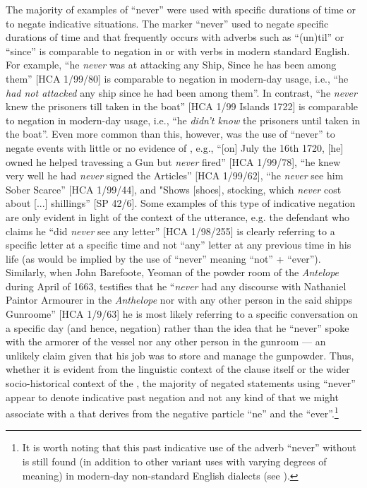 The majority of examples of “never” were used with specific durations of time or to negate indicative  situations. The marker “never” used to negate specific durations of time and that frequently occurs with adverbs such as “(un)til” or “since” is comparable to negation in  or with  verbs in modern standard English. For example, “he \textit{never} was at attacking any Ship, Since he has been among them” [HCA 1/99/80] is comparable to  negation in modern-day usage, i.e., “he \textit{had not attacked} any ship since he had been among them”. In contrast, “he \textit{never} knew the prisoners till taken in the boat” [HCA 1/99  Islands 1722] is comparable to  negation in modern-day usage, i.e., “he \textit{didn't know} the prisoners until taken in the boat”. Even more common than this, however, was the use of “never” to negate events with little or no evidence of , e.g., “[on] July the 16th 1720, [he] owned he helped travessing a Gun but \textit{never} fired” [HCA 1/99/78], “he knew very well he had \textit{never} signed the Articles” [HCA 1/99/62], “he \textit{never} see him Sober Scarce” [HCA 1/99/44], and "Shows [shoes], stocking, which \textit{never} cost about [...] shillings” [SP 42/6]. Some examples of this type of indicative  negation are only evident in light of the context of the utterance, e.g. the defendant who claims he “did \textit{never} see any letter” [HCA 1/98/255] is clearly referring to a specific letter at a specific time and not “any” letter at any previous time in his life (as would be implied by the use of “never” meaning “not” + “ever”). Similarly, when John Barefoote, Yeoman of the powder room of the \textit{Antelope} during April of 1663, testifies that he “\textit{never} had any discourse with Nathaniel Paintor Armourer in the \textit{Anthelope} nor with any other person in the said shipps Gunroome” [HCA 1/9/63] he is most likely referring to a specific conversation on a specific day (and hence,  negation) rather than the idea that he “never” spoke with the armorer of the vessel nor any other person in the gunroom — an unlikely claim given that his job was to store and manage the gunpowder. Thus, whether it is evident from the linguistic context of the clause itself or the wider socio-historical context of the , the majority of negated statements using “never” appear to denote indicative past negation and not any kind of  that we might associate with a  that derives from the negative particle “ne” and the  “ever”.\footnote{It is worth noting that this past indicative use of the adverb “never” without  is still found (in addition to other variant uses with varying degrees of  meaning) in modern-day non-standard English dialects (see \citealt{LucasWillis2012}).}  

